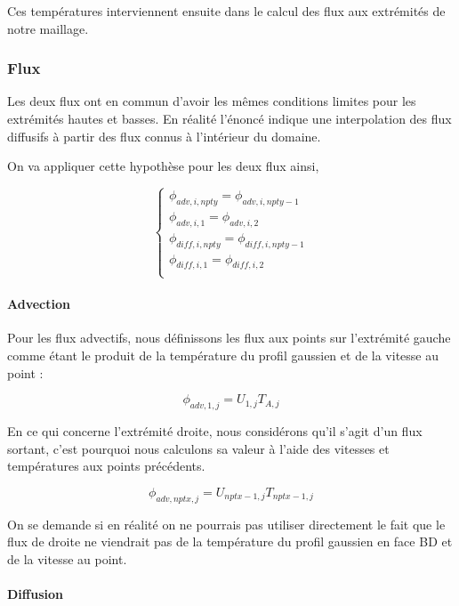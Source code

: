 \documentclass[a4paper,oneside]{article}
\begin{document}
Ces températures interviennent ensuite dans le calcul des flux aux extrémités de notre maillage.

\subsubsection{Flux}

Les deux flux ont en commun d'avoir les mêmes conditions limites pour les extrémités hautes et basses.
En réalité l'énoncé indique une interpolation des flux diffusifs à partir des flux connus à l'intérieur du domaine.

On va appliquer cette hypothèse pour les deux flux ainsi, 

\begin{equation*}
	\begin{cases}
		
	\phi_{adv,i,npty} = \phi_{adv,i,npty-1}\\
	\phi_{adv,i,1} = \phi_{adv,i,2}\\
	\phi_{diff,i,npty} = \phi_{diff,i,npty-1}\\
	\phi_{diff,i,1} = \phi_{diff,i,2}\\
	\end{cases}
\end{equation*}

\paragraph{Advection}
Pour les flux advectifs, nous définissons les flux aux points sur l'extrémité gauche comme étant le produit de la température du profil gaussien et de la vitesse au point :

\[
 \phi_{adv,1,j} =U_{1,j}T_{A,j}
\]


En ce qui concerne l'extrémité droite, nous considérons qu'il s'agit d'un flux sortant, c'est pourquoi nous calculons sa valeur à l'aide des vitesses et températures aux points précédents.
  
\[
 \phi_{adv,nptx,j} =U_{nptx-1,j}T_{nptx-1,j}
\]  

On se demande si en réalité on ne pourrais pas utiliser directement le fait que le flux de droite ne viendrait pas de la température du profil gaussien en face BD et de la vitesse au point.

\paragraph{Diffusion}
\end{document}
